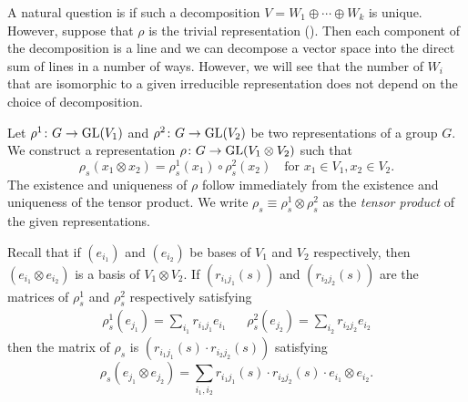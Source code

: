 \documentclass[letterpaper, 11pt, oneside]{book}
\begin{document}
A natural question is if such a decomposition $V = W_{1} \oplus \cdots \oplus W_{k}$ is unique.
However, suppose that $\rho$ is the trivial representation ().
Then each component of the decomposition is a line and we can decompose a vector space into the direct sum of lines in a number of ways.
However, we will see that the number of $W_{i}$ that are isomorphic to a given irreducible representation does not depend on the choice of decomposition.

\begin{defn}
  Let $\rho^{1}\colon G \to \operatorname{GL}(V_{1})$ and $\rho^{2}\colon G \to \operatorname{GL}(V_{2})$ be two representations of a group $G$.
  We construct a representation $\rho\colon G \to \operatorname{GL}(V_{1} \otimes V_{2})$ such that
  \[
    \rho_{s}(x_{1} \otimes x_{2}) = \rho_{s}^{1}(x_{1}) \circ \rho_{s}^{2}(x_{2}) \quad \text{for } x_{1} \in V_{1}, x_{2} \in V_{2}.
  \]
  The existence and uniqueness of $\rho$ follow immediately from the existence and uniqueness of the tensor product.
  We write $\rho_{s} \equiv \rho_{s}^{1} \otimes \rho_{s}^{2}$ as the \emph{tensor product} of the given representations.
\end{defn}

Recall that if $(e_{i_{1}})$ and $(e_{i_{2}})$ be bases of $V_{1}$ and $V_{2}$ respectively, then $(e_{i_{1}} \otimes e_{i_{2}})$ is a basis of $V_{1} \otimes V_{2}$.
If $(r_{i_{1}j_{1}}(s))$ and $(r_{i_{2}j_{2}}(s))$ are the matrices of $\rho_{s}^{1}$ and $\rho_{s}^{2}$ respectively satisfying
\begin{align*}
  \rho_{s}^{1}(e_{j_{1}}) = \sum_{i_{1}} r_{i_{1}j_{1}} e_{i_{1}} && \rho_{s}^{2}(e_{j_{2}}) = \sum_{i_{2}} r_{i_{2}j_{2}} e_{i_{2}}
\end{align*}
then the matrix of $\rho_{s}$ is $(r_{i_{1}j_{1}}(s) \cdot r_{i_{2}j_{2}}(s))$ satisfying
\[
  \rho_{s}(e_{j_{1}} \otimes e_{j_{2}}) = \sum_{i_{1}, i_{2}} r_{i_{1}j_{1}}(s) \cdot r_{i_{2}j_{2}}(s) \cdot e_{i_{1}} \otimes e_{i_{2}}.
\]
\end{document}
